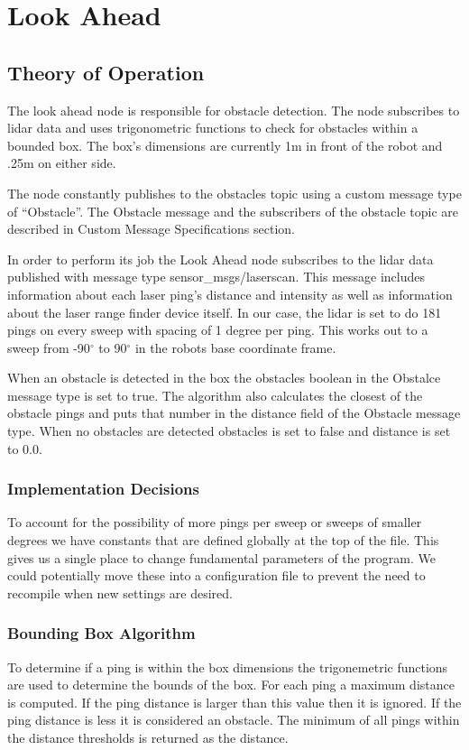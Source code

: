 \section{Look Ahead}
\subsection{Theory of Operation}

The look ahead node is responsible for obstacle detection. The node
subscribes to lidar data and uses trigonometric functions to check for
obstacles within a bounded box.  The box's dimensions are currently 1m
in front of the robot and .25m on either side. 

The node constantly publishes to the obstacles topic using a custom
message type of ``Obstacle''.  The Obstacle message and the
subscribers of the obstacle topic are described in Custom Message
Specifications section.

In order to perform its job the Look Ahead node subscribes to the
lidar data published with message type sensor\_msgs/laserscan. This message
includes information about each laser ping's distance and intensity as
well as information about the laser range finder device itself.  In
our case, the lidar is set to do 181 pings on every sweep with spacing
of 1 degree per ping.  This works out to a sweep from -90$^\circ$ to
90$^\circ$ in the robots base coordinate frame.

When an obstacle is detected in the box the obstacles boolean in the
Obstalce message type is set to true. The algorithm also calculates
the closest of the obstacle pings and puts that number in the distance field
of the Obstacle message type. When no obstacles are detected obstacles
is set to false and distance is set to 0.0.

\subsubsection{Implementation Decisions}

To account for the possibility of more pings per sweep or sweeps of
smaller degrees we have constants that are defined globally at the top
of the file.  This gives us a single place to change fundamental
parameters of the program.  We could potentially move these into a
configuration file to prevent the need to recompile when new settings
are desired.

\subsubsection{Bounding Box Algorithm}
To determine if a ping is within the box dimensions the trigonemetric
functions are used to determine the bounds of the box.  For each ping
a maximum distance is computed.  If the ping distance is larger than this
value then it is ignored. If the ping distance is less it is
considered an obstacle.  The minimum of all pings within the distance
thresholds is returned as the distance.

